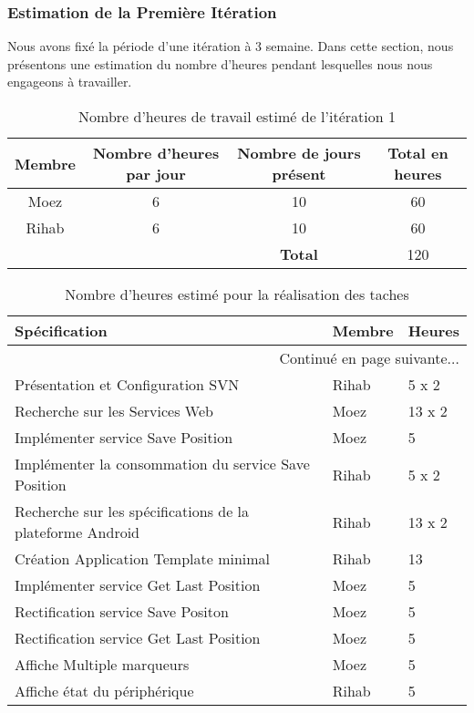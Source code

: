 \subsubsection{Estimation de la Première Itération}

Nous avons fixé la période d'une itération à 3 semaine. Dans cette section,
nous présentons une estimation du nombre d'heures pendant lesquelles nous nous
engageons à travailler.

\begin{table}[htbp]
    \centering
    \begin{tabular}{| c | c | c | c |}
\hline
\textbf{Membre} & \textbf{Nombre d'heures par jour} & \textbf{Nombre de jours présent} & \textbf{Total en heures} \\ \hline
\hline

Moez & 6 & 10 & 60\\ \hline
Rihab & 6 & 10 & 60 \\ \hline
\multicolumn{2}{c|}{} & \textbf{Total} & 120 \\ \cline{3-4}
    \end{tabular}
    \caption{Nombre d'heures de travail estimé de l'itération 1}
    \label{tab:sprint1-capacity}
\end{table}

\begin{center}
    \begin{longtable}{| l | l | l |}
        \caption{Nombre d'heures estimé pour la réalisation des taches}
        \label{tab:sprint1-estimation} \\

 \hline
 \textbf{Spécification} & \textbf{Membre} & \textbf{Heures} \\ \hline
 \endhead

 \hline \multicolumn{3}{|r|}{{Continué en page suivante$\dotsc$}} \\ \hline
 \endfoot

 \hline \hline
 \endlastfoot

\hline
Présentation et Configuration SVN & Rihab & 5 x 2 \\ \hline
Recherche sur les Services Web & Moez & 13 x 2 \\ \hline
Implémenter service Save Position & Moez & 5 \\ \hline
Implémenter la consommation du service Save Position & Rihab & 5 x 2 \\ \hline
Recherche sur les spécifications de la plateforme Android & Rihab & 13 x 2 \\ \hline
Création Application Template minimal & Rihab & 13 \\ \hline
Implémenter service Get Last Position & Moez & 5 \\ \hline
Rectification service Save Positon & Moez & 5 \\ \hline
Rectification service Get Last Position & Moez & 5 \\ \hline
Affiche Multiple marqueurs & Moez & 5 \\ \hline
Affiche état du périphérique & Rihab & 5 \\ \hline
\end{longtable}
\end{center}

